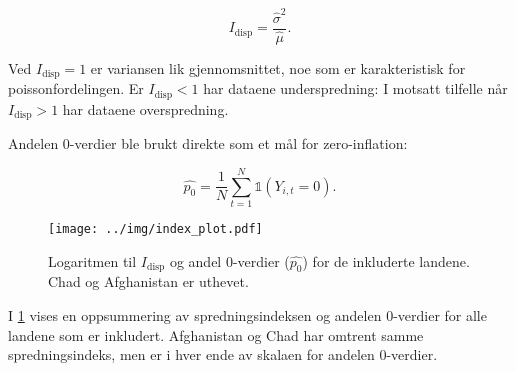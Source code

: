  $$
    I_{\mathrm{disp}} = \frac{\hat{\sigma}^2}{\hat{\mu}}.
 $$

Ved $I_{\mathrm{disp}} = 1$ er variansen lik gjennomsnittet, noe som er
karakteristisk for poissonfordelingen. Er $I_{\mathrm{disp}} < 1$ har dataene
underspredning: I motsatt tilfelle når $I_{\mathrm{disp}} > 1$ har dataene
overspredning. 

Andelen 0-verdier ble brukt direkte som et mål for zero-inflation:

$$
\hat{p_0} = \frac{1}{N}\sum_{t=1}^N \mathds{1}(Y_{i,t}=0).
$$

    \begin{figure}[!h]
    \centering
    \texttt{[image: ../img/index\_plot.pdf]}
        \caption{
            Logaritmen til $I_{\mathrm{disp}}$ og andel 0-verdier ($\hat{p_0}$) for
            de inkluderte landene. Chad og Afghanistan er uthevet.
        }
    \label{fig:index_plot}
    \end{figure}

I \cref{fig:index_plot} vises en oppsummering av spredningsindeksen og andelen
0-verdier for alle landene som er inkludert. Afghanistan og Chad har omtrent
samme spredningsindeks, men er i hver ende av skalaen for andelen 0-verdier.

